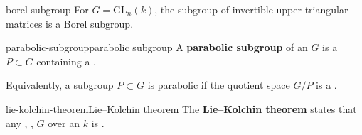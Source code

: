 \begin{example}{borel-subgroup}
    For $G = \text{GL}_n(k)$, the subgroup of invertible upper triangular matrices is a Borel subgroup.
\end{example}


\begin{topic}{parabolic-subgroup}{parabolic subgroup}
    A \textbf{parabolic subgroup} of an  $G$ is a  $P \subset G$ containing a .
    
    Equivalently, a subgroup $P \subset G$ is parabolic if the quotient space $G/P$ is a .
\end{topic}

\begin{topic}{lie-kolchin-theorem}{Lie--Kolchin theorem}
    The \textbf{Lie--Kolchin theorem} states that any , ,   $G$ over an  $k$ is .
\end{topic}

